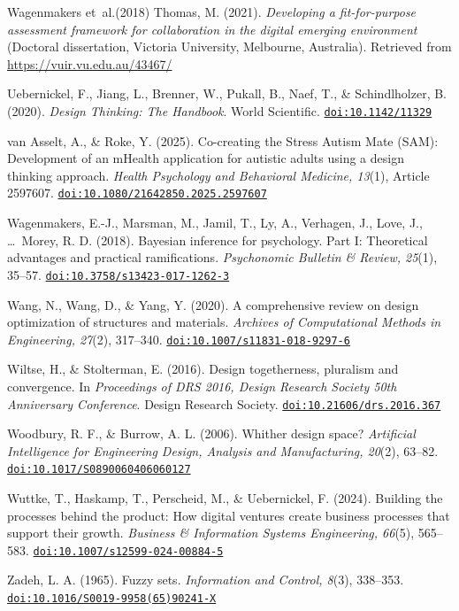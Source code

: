\documentclass[11pt]{article}
\providecommand{\doi}[1]{\href{https://doi.org/#1}{\nolinkurl{doi:#1}}}
\begin{document}
\begin{thebibliography}{Wagenmakers et~al.(2018)}
 Thomas, M. (2021). \textit{Developing a fit-for-purpose assessment framework for collaboration in the digital emerging environment} (Doctoral dissertation, Victoria University, Melbourne, Australia). Retrieved from \url{https://vuir.vu.edu.au/43467/}

 Uebernickel, F., Jiang, L., Brenner, W., Pukall, B., Naef, T., \& Schindlholzer, B. (2020). \textit{Design Thinking: The Handbook}. World Scientific. \doi{10.1142/11329}

 van Asselt, A., \& Roke, Y. (2025). Co-creating the Stress Autism Mate (SAM): Development of an mHealth application for autistic adults using a design thinking approach. \textit{Health Psychology and Behavioral Medicine, 13}(1), Article 2597607. \doi{10.1080/21642850.2025.2597607}

 Wagenmakers, E.-J., Marsman, M., Jamil, T., Ly, A., Verhagen, J., Love, J., \ldots\ Morey, R. D. (2018). Bayesian inference for psychology. Part I: Theoretical advantages and practical ramifications. \textit{Psychonomic Bulletin \& Review, 25}(1), 35--57. \doi{10.3758/s13423-017-1262-3}

 Wang, N., Wang, D., \& Yang, Y. (2020). A comprehensive review on design optimization of structures and materials. \textit{Archives of Computational Methods in Engineering, 27}(2), 317--340. \doi{10.1007/s11831-018-9297-6}

 Wiltse, H., \& Stolterman, E. (2016). Design togetherness, pluralism and convergence. In \textit{Proceedings of DRS 2016, Design Research Society 50th Anniversary Conference}. Design Research Society. \doi{10.21606/drs.2016.367}

 Woodbury, R. F., \& Burrow, A. L. (2006). Whither design space? \textit{Artificial Intelligence for Engineering Design, Analysis and Manufacturing, 20}(2), 63--82. \doi{10.1017/S0890060406060127}

 Wuttke, T., Haskamp, T., Perscheid, M., \& Uebernickel, F. (2024). Building the processes behind the product: How digital ventures create business processes that support their growth. \textit{Business \& Information Systems Engineering, 66}(5), 565--583. \doi{10.1007/s12599-024-00884-5}

 Zadeh, L. A. (1965). Fuzzy sets. \textit{Information and Control, 8}(3), 338--353. \doi{10.1016/S0019-9958(65)90241-X}

\end{thebibliography}
\end{document}
